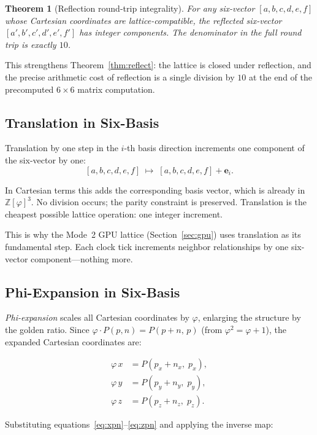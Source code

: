 \documentclass[12pt]{article}
\newtheorem{theorem}{Theorem}[section]
\theoremstyle{definition}
\theoremstyle{remark}
\begin{document}
\begin{theorem}[Reflection round-trip integrality]
\label{thm:roundtrip}
For any six-vector $[a,b,c,d,e,f]$ whose Cartesian coordinates are
lattice-compatible, the reflected six-vector $[a',b',c',d',e',f']$
has integer components.  The denominator in the full round trip is
exactly $10$.
\end{theorem}

This strengthens Theorem~\ref{thm:reflect}: the lattice is closed
under reflection, and the precise arithmetic cost of reflection is
a single division by $10$ at the end of the precomputed $6\times 6$
matrix computation.

\subsection{Translation in Six-Basis}

Translation by one step in the $i$-th basis direction increments one
component of the six-vector by one:
\[
  [a,b,c,d,e,f] \;\longmapsto\; [a,b,c,d,e,f] + \mathbf{e}_i.
\]

In Cartesian terms this adds the corresponding basis vector, which is
already in $\mathbb{Z}[\varphi]^3$.  No division occurs; the parity
constraint is preserved.  Translation is the cheapest possible lattice
operation: one integer increment.

This is why the Mode~2 GPU lattice (Section~\ref{sec:gpu}) uses
translation as its fundamental step.  Each clock tick increments
neighbor relationships by one six-vector component---nothing more.

\subsection{Phi-Expansion in Six-Basis}

\emph{Phi-expansion} scales all Cartesian coordinates by $\varphi$,
enlarging the structure by the golden ratio.  Since
$\varphi \cdot P(p,n) = P(p+n,\,p)$ (from $\varphi^2=\varphi+1$),
the expanded Cartesian coordinates are:

\begin{align*}
  \varphi\,x &= P(p_x + n_x,\; p_x), \\
  \varphi\,y &= P(p_y + n_y,\; p_y), \\
  \varphi\,z &= P(p_z + n_z,\; p_z).
\end{align*}

Substituting equations~\eqref{eq:xpn}--\eqref{eq:zpn} and applying
the inverse map:
\end{document}
